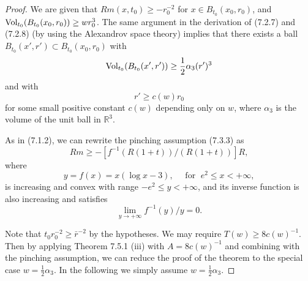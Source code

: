 \begin{proof}
We are given that $Rm(x,t_0)\geq -r^{-2}_0$ for $x \in
B_{t_0}(x_0,r_0)$, and $\operatorname{Vol}_{t_0}(B_{t_0}(x_0,r_0))\geq w r^3_0$.
The same argument in the derivation of (7.2.7) and (7.2.8) (by
using the Alexandrov space theory) implies that there exists a
ball $B_{t_0}(x',r')\subset B_{t_0}(x_0,r_0)$ with \begin{equation}
\operatorname{Vol}_{t_0}(B_{t_0}(x',r'))\geq \frac{1}{2}\alpha_3(r')^3
\end{equation} and with \begin{equation}
r'\geq c(w)r_0 %
\end{equation} for some small positive constant $c(w)$ depending only on $w$,
where $\alpha_3$ is the volume of the unit ball in $\mathbb{R}^3$.

As in (7.1.2), we can rewrite the pinching assumption (7.3.3) as
$$
Rm \geq-[f^{-1}(R(1+t))/(R(1+t))]R,
$$
where
$$
y= f(x) = x(\log x - 3), \quad \mbox{ for }\; e^2 \leq x <
+\infty,
$$
is increasing and convex with range $-e^2 \leq y < +\infty$, and
its inverse function is also increasing and satisfies
$$
\lim_{y\rightarrow +\infty} f^{-1}(y)/y = 0.
$$

Note that $t_0 r^{-2}_0 \geq \bar{r}^{-2}$ by the hypotheses. We
may require $T(w) \geq 8c(w)^{-1}$. Then by applying Theorem 7.5.1
(iii) with $A=8c(w)^{-1}$ and combining with the pinching
assumption, we can reduce the proof of the theorem to the special
case $w=\frac{1}{2}\alpha_3$. In the following we simply assume
$w=\frac{1}{2}\alpha_3$.


\end{proof}
